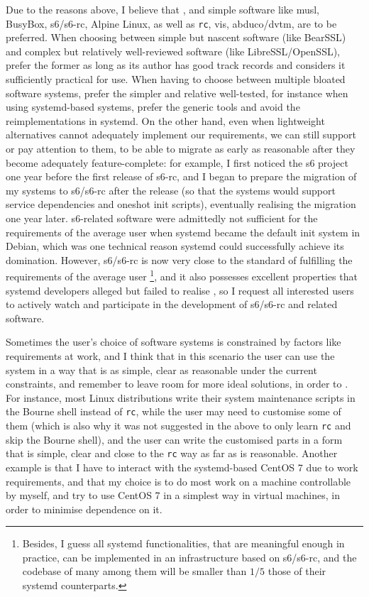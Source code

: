 Due to the reasons above, I believe that ,
and simple software like musl, BusyBox, s6/s6-rc, Alpine Linux, as well as
\verb|rc|, vis, abduco/dvtm, are to be preferred.  When choosing between simple
but nascent software (like BearSSL) and complex but relatively well-reviewed
software (like LibreSSL/OpenSSL), prefer the former as long as its author has
good track records and considers it sufficiently practical for use.  When having
to choose between multiple bloated software systems, prefer the simpler and
relative well-tested, for instance when using systemd-based systems, prefer the
generic tools and avoid the reimplementations in systemd.  On the other hand,
even when lightweight alternatives cannot adequately implement our requirements,
we can still support or pay attention to them, to be able to migrate as early as
reasonable after they become adequately feature-complete: for example, I first
noticed the s6 project one year before the first release of s6-rc, and I began
to prepare the migration of my systems to s6/s6-rc after the release (so that
the systems would support service dependencies and oneshot init scripts),
eventually realising the migration one year later.  s6-related software were
admittedly not sufficient for the requirements of the average user when systemd
became the default init system in Debian, which was one technical reason systemd
could successfully achieve its domination.  However, s6/s6-rc is now very
close to the standard of fulfilling the requirements of the average user%
\footnote{Besides, I guess all systemd
functionalities, that are meaningful enough in practice, can be implemented in
an infrastructure based on s6/s6-rc, and the codebase of many among them will be
smaller than $1/5$ those of their systemd counterparts.}, and it also possesses
excellent properties that systemd developers alleged but failed to realise%
, so I request all interested users to actively
watch and participate in the development of s6/s6-rc and related software.

Sometimes the user's choice of software systems is constrained by factors like
requirements at work, and I think that in this scenario the user can use the
system in a way that is as simple, clear as reasonable under the current
constraints, and remember to leave room for more ideal solutions, in order to
.  For instance,
most Linux distributions write their system maintenance scripts in the Bourne
shell instead of \verb|rc|, while the user may need to customise some of them
(which is also why it was not suggested in the above to only learn \verb|rc|
and skip the Bourne shell), and the user can write the customised parts in
a form that is simple, clear and close to the \verb|rc| way as far as is
reasonable.  Another example is that I have to interact with the systemd-based
CentOS 7 due to work requirements, and that my choice is to do most work on
a machine controllable by myself, and try to use CentOS 7 in a simplest way
in virtual machines, in order to minimise dependence on it.

